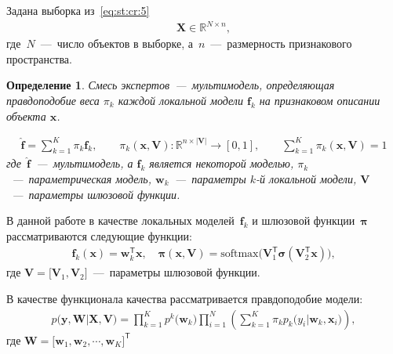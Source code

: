\documentclass[12pt, twoside]{article}
\newtheorem{definition}{Определение}[section]
\numberwithin{equation}{section}
\begin{document}
Задана выборка из~\eqref{eq:st:cr:5} 
\begin{equation}
\label{eq:st:1}
\begin{aligned}
\textbf{X} \in \mathbb{R}^{N \times n},
\end{aligned}
\end{equation}
где~$N$~---~число объектов в выборке, а~$n$~---~размерность признакового пространства.

\begin{definition}
\label{def:1}
Смесь экспертов~---~мультимодель, определяющая правдоподобие веса $\pi_k$ каждой локальной модели $\textbf{f}_k$ на признаковом описании объекта $\textbf{x}$.

\begin{equation}
\label{eq:st:2}
\begin{aligned}
\hat{\mathbf{f}} = \sum_{k=1}^{K}\pi_{k}\mathbf{f}_k, \qquad \pi_{k}\left(\mathbf{x}, \mathbf{V}\right):\mathbb{R}^{n\times \left|\mathbf{V}\right|} \to [0, 1], \qquad \sum_{k=1}^{K}\pi_{k}\left(\mathbf{x}, \mathbf{V}\right) = 1
\end{aligned}
\end{equation}
где~$\hat{\mathbf{f}}$~---~мультимодель, а $\mathbf{f}_k$ является некоторой моделью, $\pi_k$~---~параметрическая модель, $\mathbf{w}_k$~---~параметры $k$-й локальной модели, $\mathbf{V}$~---~параметры шлюзовой функции.
\end{definition}

В данной работе в качестве локальных моделей~$\mathbf{f}_k$ и шлюзовой функции~$\bm{\pi}$ рассматриваются следующие функции:
\begin{equation}
\label{eq:st:3}
\begin{aligned}
\mathbf{f}_k\left(\textbf{x}\right) = \textbf{w}_k^{\mathsf{T}}\textbf{x}, \quad
\bm{\pi}\left(\mathbf{x}, \mathbf{V}\right) = \text{softmax}\bigr(\mathbf{V}_{1}^{\mathsf{T}}\bm{\sigma}\left(\mathbf{V}_2^{\mathsf{T}}\mathbf{x}\right)\bigr),
\end{aligned}
\end{equation}
где $\mathbf{V} = \bigr[\mathbf{V}_1, \mathbf{V}_2\bigr]$~---~параметры шлюзовой функции.

В качестве функционала качества рассматривается правдоподобие модели:
\begin{equation}
\label{eq:st:4}
\begin{aligned}
p\bigr(\mathbf{y}, \mathbf{W}|\mathbf{X}, \mathbf{V}\bigr) = \prod_{k=1}^{K}p^{k}\bigr(\mathbf{w}_k\bigr)\prod_{i=1}^{N}\left(\sum_{k=1}^{K}\pi_{k}p_{k}\bigr(y_i|\mathbf{w}_k, \mathbf{x}_i\bigr)\right),
\end{aligned}
\end{equation}
где $\mathbf{W} = \bigr[\mathbf{w}_1, \mathbf{w}_2, \cdots, \mathbf{w}_K\bigr]^{\mathsf{T}}$
\end{document}
